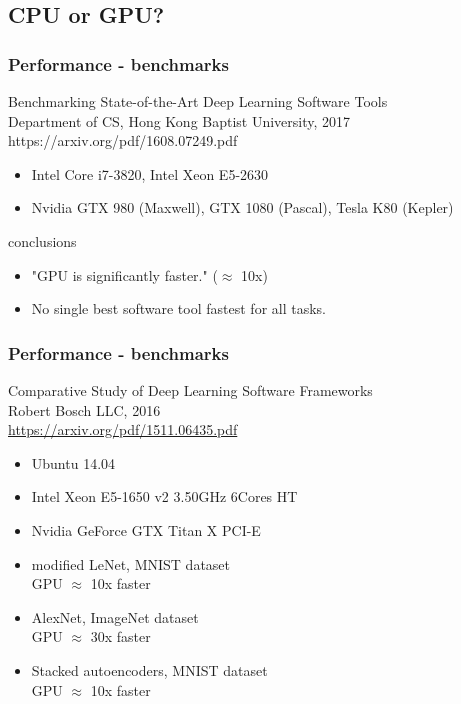 \documentclass{beamer}
\begin{document}
		\subsection{CPU or GPU?}
		
			\begin{frame}
				\frametitle{Performance - benchmarks}
				Benchmarking State-of-the-Art Deep Learning Software Tools\\
				Department of CS, Hong Kong Baptist University, 2017\\
				https://arxiv.org/pdf/1608.07249.pdf\\
				\begin{itemize}
					\item Intel Core i7-3820, Intel Xeon E5-2630
					\item Nvidia GTX 980 (Maxwell), GTX 1080 (Pascal), Tesla K80 (Kepler)
				\end{itemize}
				conclusions
				\begin{itemize}
					\item "GPU is significantly faster." ($\approx$ 10x)
					\item No single best software tool fastest for all tasks.
				\end{itemize}
			\end{frame}
			
			\begin{frame}
				\frametitle{Performance - benchmarks}
				Comparative Study of Deep Learning Software Frameworks\\
				Robert Bosch LLC, 2016\\
				\url{https://arxiv.org/pdf/1511.06435.pdf}\\
				\begin{itemize}
					\item Ubuntu 14.04
					\item Intel Xeon E5-1650 v2 3.50GHz 6Cores HT 
					\item Nvidia GeForce GTX Titan X PCI-E 
				\end{itemize}
				\begin{itemize}
					\item modified LeNet, MNIST dataset\\
						GPU $\approx$ 10x faster
					\item AlexNet, ImageNet dataset\\
						GPU $\approx$ 30x faster
					\item Stacked autoencoders, MNIST dataset\\
						GPU $\approx$ 10x faster
				\end{itemize}
			\end{frame}
			
\end{document}
